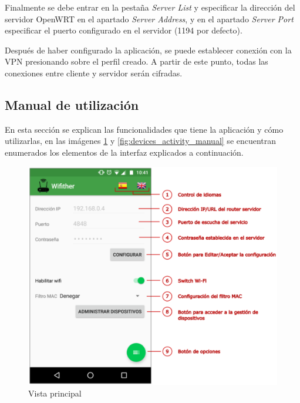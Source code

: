 \documentclass[12pt]{article}
\begin{document}
\begin{enumerate}
                Finalmente se debe entrar en la pestaña \textit{Server List} y especificar la dirección del servidor OpenWRT en el apartado \textit{Server Address}, y en el apartado \textit{Server Port} especificar el puerto configurado en el servidor (1194 por defecto).

                Después de haber configurado la aplicación, se puede establecer conexión con la VPN presionando sobre el perfil creado. A partir de este punto, todas las conexiones entre cliente y servidor serán cifradas.
            \end{enumerate}

    \subsection{Manual de utilización}
        En esta sección se explican las funcionalidades que tiene la aplicación y cómo utilizarlas, en las imágenes \ref{fig:main_activity_manual} y \ref{fig:devices_activity_manual} se encuentran enumerados los elementos de la interfaz explicados a continuación.

        \begin{figure}[h!]
            \centering
                \includegraphics[scale=0.5]{main_activity_manual.eps}
                \caption{Vista principal}
                \label{fig:main_activity_manual}
        \end{figure}
\end{document}
